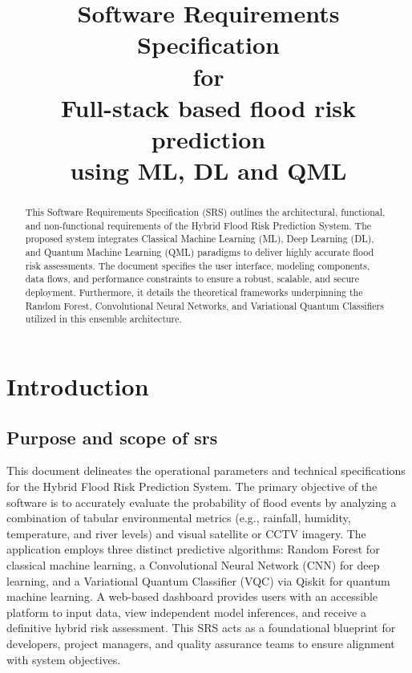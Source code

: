 \documentclass[conference]{IEEEtran}
\begin{document}
\title{Software Requirements Specification \\ for \\ Full-stack based flood risk prediction \\ using ML, DL and QML}

\author{
\vspace{0.2cm}
}

\maketitle

\tableofcontents
\newpage

\begin{abstract}
This Software Requirements Specification (SRS) outlines the architectural, functional, and non-functional requirements of the Hybrid Flood Risk Prediction System. The proposed system integrates Classical Machine Learning (ML), Deep Learning (DL), and Quantum Machine Learning (QML) paradigms to deliver highly accurate flood risk assessments. The document specifies the user interface, modeling components, data flows, and performance constraints to ensure a robust, scalable, and secure deployment. Furthermore, it details the theoretical frameworks underpinning the Random Forest, Convolutional Neural Networks, and Variational Quantum Classifiers utilized in this ensemble architecture.
\end{abstract}

\section{Introduction}
\subsection{Purpose and scope of srs}
This document delineates the operational parameters and technical specifications for the Hybrid Flood Risk Prediction System. The primary objective of the software is to accurately evaluate the probability of flood events by analyzing a combination of tabular environmental metrics (e.g., rainfall, humidity, temperature, and river levels) and visual satellite or CCTV imagery. The application employs three distinct predictive algorithms: Random Forest for classical machine learning, a Convolutional Neural Network (CNN) for deep learning, and a Variational Quantum Classifier (VQC) via Qiskit for quantum machine learning. A web-based dashboard provides users with an accessible platform to input data, view independent model inferences, and receive a definitive hybrid risk assessment. This SRS acts as a foundational blueprint for developers, project managers, and quality assurance teams to ensure alignment with system objectives.
\end{document}
